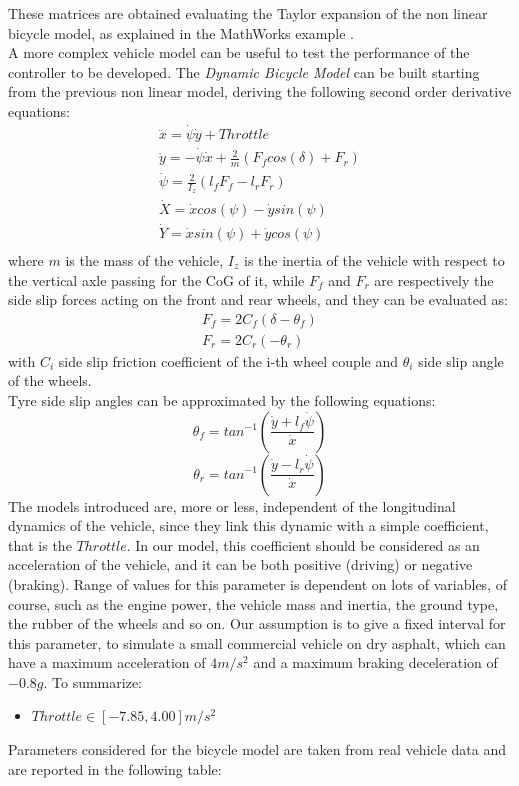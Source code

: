 These matrices are obtained evaluating the Taylor expansion of the non linear bicycle model, as explained in the MathWorks example \cite{StaticObs}.\\
A more complex vehicle model can be useful to test the performance of the controller to be developed. The \textit{Dynamic Bicycle Model} \cite{7225830} can be built starting from the previous non linear model, deriving the following second order derivative equations:
\begin{align}
    \ddot{x} = \dot{\psi}\dot{y} + Throttle\\
    \ddot{y} = -\dot{\psi}\dot{x} + \frac{2}{m}\left(F_fcos(\delta) + F_r\right)\\
    \ddot{\psi} = \frac{2}{I_z}\left(l_fF_f - l_rF_r\right)\\
    \dot{X} = \dot{x}cos(\psi) - \dot{y}sin(\psi)\\
    \dot{Y} = \dot{x}sin(\psi) + \dot{y}cos(\psi)\\
\end{align}
where $m$ is the mass of the vehicle, $I_z$ is the inertia of the vehicle with respect to the vertical axle passing for the CoG of it, while $F_f$ and $F_r$ are respectively the side slip forces acting on the front and rear wheels, and they can be evaluated as:
\begin{align}
    F_f = 2C_f\left(\delta - \theta_f\right)\\
    F_r = 2C_r\left(-\theta_r\right)
\end{align}
with $C_i$ side slip friction coefficient of the i-th wheel couple and $\theta_i$ side slip angle of the wheels.\\
Tyre side slip angles can be approximated by the following equations:
\begin{equation}
    \theta_f=tan^{-1}\left(\frac{\dot{y} + l_f\dot{\psi}}{\dot{x}}\right)
\end{equation}
\begin{equation}
    \theta_r=tan^{-1}\left(\frac{\dot{y} - l_r\dot{\psi}}{\dot{x}}\right)
\end{equation}
The models introduced are, more or less, independent of the longitudinal dynamics of the vehicle, since they link this dynamic with a simple coefficient, that is the $Throttle$. In our model, this coefficient should be considered as an acceleration of the vehicle, and it can be both positive (driving) or negative (braking). Range of values for this parameter is dependent on lots of variables, of course, such as the engine power, the vehicle mass and inertia, the ground type, the rubber of the wheels and so on. Our assumption is to give a fixed interval for this parameter, to simulate a small commercial vehicle on dry asphalt, which can have a maximum acceleration of $4 m/s^2$ and a maximum braking deceleration of $-0.8g$. To summarize:
\begin{itemize}
    \item $Throttle \in [-7.85, 4.00]m/s^2$
    \label{item:Throttle}
\end{itemize}
Parameters considered for the bicycle model are taken from real vehicle data \cite{10.2307/44733900} and are reported in the following table:

